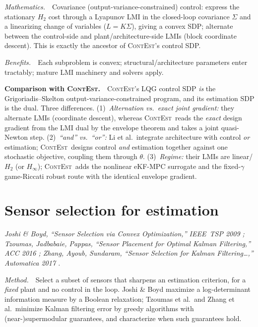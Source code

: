 \documentclass[11pt]{article}
\newcommand{\Th}{\theta}
\newcommand{\ContEst}{\textsc{ContEst}}
\newcommand{\Method}{\smallskip\noindent\textit{Method.}~}
\newcommand{\Maths}{\smallskip\noindent\textit{Mathematics.}~}
\newcommand{\Benefits}{\smallskip\noindent\textit{Benefits.}~}
\newcommand{\Versus}{\smallskip\noindent\textbf{Comparison with \ContEst.}~}
\begin{document}
\Maths\ Covariance (output-variance-constrained) control: express the stationary
$H_2$ cost through a Lyapunov LMI in the closed-loop covariance $\Sigma$ and a
linearizing change of variables ($L=K\Sigma$), giving a convex SDP; alternate
between the control-side and plant/architecture-side LMIs (block coordinate
descent). This is exactly the ancestor of \ContEst's control SDP.

\Benefits\ Each subproblem is convex; structural/architecture parameters enter
tractably; mature LMI machinery and solvers apply.

\Versus\ \ContEst's LQG control SDP \emph{is} the Grigoriadis--Skelton
output-variance-constrained program, and its estimation SDP is the dual. Three
differences. (1)~\emph{Alternation vs.\ exact joint gradient:} they alternate
LMIs (coordinate descent), whereas \ContEst\ reads the \emph{exact} design gradient
from the LMI dual by the envelope theorem and takes a joint quasi-Newton step.
(2)~\emph{``and'' vs.\ ``or'':} Li et al.\ integrate architecture with control
\emph{or} estimation; \ContEst\ designs control \emph{and} estimation together
against one stochastic objective, coupling them through $\Th$. (3)~\emph{Regime:}
their LMIs are linear/$H_2$ (or $H_\infty$); \ContEst\ adds the nonlinear eKF-MPC
surrogate and the fixed-$\gamma$ game-Riccati robust route with the identical
envelope gradient.

\section{Sensor selection for estimation}\label{sec:sensorsel}
\noindent\emph{Joshi \& Boyd, ``Sensor Selection via Convex Optimization,''
IEEE~TSP 2009 \cite{joshi2009sensor}; Tzoumas, Jadbabaie, Pappas, ``Sensor
Placement for Optimal Kalman Filtering,'' ACC 2016 \cite{tzoumas2016sensor};
Zhang, Ayoub, Sundaram, ``Sensor Selection for Kalman Filtering\dots,'' Automatica
2017 \cite{zhang2017sensor}.}

\Method\ Select a subset of sensors that sharpens an estimation criterion, for a
\emph{fixed} plant and no control in the loop. Joshi \& Boyd maximize a
log-determinant information measure by a Boolean relaxation; Tzoumas et al.\ and
Zhang et al.\ minimize Kalman filtering error by greedy algorithms with
(near-)supermodular guarantees, and characterize when such guarantees hold.
\end{document}
